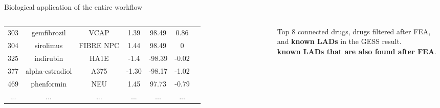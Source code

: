\documentclass[10pt]{beamer}
\begin{document}
\begin{frame}{Biological application of the entire workflow}
\begin{columns}
\begin{table}
{\begin{tabular}{ccccccc}
 303 & gemfibrozil & VCAP & 1.39 & 98.49 & 0.86 &  \\ 
 \rowcolor{yellow!70}  304 & sirolimus & FIBRE NPC & 1.44 & 98.49 & 0 & \citep{Ehninger2014-ip} \\ 
 \rowcolor{yellow!70}  325 & indirubin & HA1E & -1.4 & -98.39 & -0.02 & \citep{Spindler2012-an} \\ 
 \rowcolor{yellow!70}  377 & alpha-estradiol & A375 & -1.30 & -98.17 & -1.02 & \citep{Harrison2014-yo} \\
 \rowcolor{yellow!70} 469 & phenformin & NEU & 1.45 & 97.73 & -0.79 & \citep{Cabreiro2013-zc} \\ 
 ... & ... & ... & ... & ... & ... &  \\ 
   \hline
\end{tabular}}
  \end{table}
\scriptsize
Top 8 connected drugs, drugs filtered after FEA, and \textcolor{yellow!70}{\textbf{known LADs}} in the GESS result. \\
\addlinespace
\textcolor{red!70}{\textbf{known LADs that are also found after FEA}}.
    \end{columns}
\end{frame}
\end{document}
